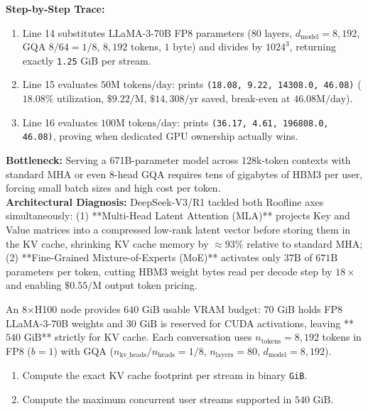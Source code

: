 \textbf{Step-by-Step Trace:}
\begin{enumerate}[leftmargin=18pt]
  \item Line 14 substitutes LLaMA-3-70B FP8 parameters ($80$ layers, $d_{\text{model}}=8,192$, GQA $8/64=1/8$, $8,192$ tokens, $1\text{ byte}$) and divides by $1024^3$, returning exactly \texttt{1.25} GiB per stream.
  \item Line 15 evaluates $50\text{M tokens/day}$: prints \texttt{(18.08, 9.22, 14308.0, 46.08)} ($18.08\%$ utilization, $\$9.22/\text{M}$, $\$14,308/\text{yr}$ saved, break-even at $46.08\text{M/day}$).
  \item Line 16 evaluates $100\text{M tokens/day}$: prints \texttt{(36.17, 4.61, 196808.0, 46.08)}, proving when dedicated GPU ownership actually wins.
\end{enumerate}

\begin{realworldbox}
\textbf{Bottleneck:} Serving a 671B-parameter model across 128k-token contexts with standard MHA or even 8-head GQA requires tens of gigabytes of HBM3 per user, forcing small batch sizes and high cost per token.\\
\textbf{Architectural Diagnosis:} DeepSeek-V3/R1 tackled both Roofline axes simultaneously: (1) **Multi-Head Latent Attention (MLA)** projects Key and Value matrices into a compressed low-rank latent vector before storing them in the KV cache, shrinking KV cache memory by $\approx 93\%$ relative to standard MHA; (2) **Fine-Grained Mixture-of-Experts (MoE)** activates only $37\text{B}$ of $671\text{B}$ parameters per token, cutting HBM3 weight bytes read per decode step by $18\times$ and enabling $\$0.55/\text{M}$ output token pricing.
\end{realworldbox}

\begin{tryityourselfbox}
An 8$\times$H100 node provides $640\text{ GiB}$ usable VRAM budget: $70\text{ GiB}$ holds FP8 LLaMA-3-70B weights and $30\text{ GiB}$ is reserved for CUDA activations, leaving **$540\text{ GiB}$** strictly for KV cache. Each conversation uses $n_{\text{tokens}} = 8,192$ tokens in FP8 ($b = 1$) with GQA ($n_{\text{kv\_heads}}/n_{\text{heads}} = 1/8$, $n_{\text{layers}}=80$, $d_{\text{model}}=8,192$).
\begin{enumerate}
  \item Compute the exact KV cache footprint per stream in binary \texttt{GiB}.
  \item Compute the maximum concurrent user streams supported in $540\text{ GiB}$.
\end{enumerate}
\end{tryityourselfbox}

